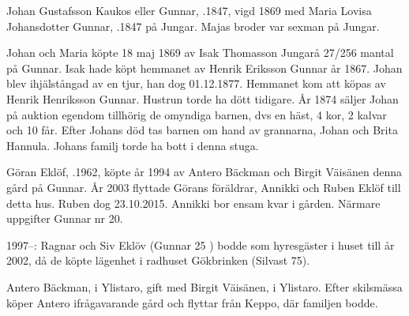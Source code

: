 Johan Gustafsson Kaukos eller Gunnar, .1847, vigd 1869 med Maria Lovisa Johansdotter Gunnar, .1847 på Jungar. Majas broder var sexman på Jungar.
\begin{jhchildren}
  \item {}
  \item {}
  \item {}
\end{jhchildren}

Johan och Maria köpte 18 maj 1869 av Isak Thomasson Jungarå 27/256 mantal på Gunnar. Isak hade köpt hemmanet av Henrik Eriksson Gunnar år 1867. Johan blev ihjälstångad av en tjur, han dog 01.12.1877. Hemmanet kom att köpas av Henrik Henriksson Gunnar. Hustrun torde ha dött tidigare. År 1874 säljer Johan på auktion egendom tillhörig de omyndiga barnen, dvs en häst, 4 kor, 2 kalvar och 10 får. Efter Johans död tas barnen om hand av grannarna, Johan och Brita Hannula. Johans familj torde ha bott i denna stuga.






Göran Eklöf, .1962, köpte år 1994 av Antero Bäckman  och Birgit Väisänen denna gård på Gunnar. År 2003 flyttade Görans föräldrar, Annikki och Ruben Eklöf till detta hus. Ruben dog 23.10.2015. Annikki bor ensam kvar i gården. Närmare uppgifter Gunnar nr 20.

1997--: Ragnar och Siv Eklöv (Gunnar 25 ) bodde som hyresgäster i huset till år 2002, då de köpte lägenhet i radhuset Gökbrinken (Silvast 75).


Antero Bäckman,  i Ylistaro, gift med Birgit Väisänen,  i Ylistaro. Efter skilsmässa köper Antero ifrågavarande gård och flyttar från Keppo, där familjen bodde.
\begin{jhchildren}
  \item {}
  \item {}
\end{jhchildren}


